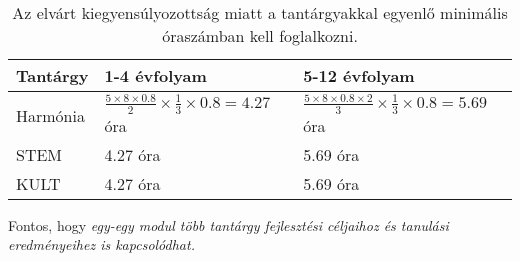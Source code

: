 \begin{table}

  \begin{tabular}{ l|l|l }

    \textbf{Tantárgy} & \textbf{1-4 évfolyam}          & \textbf{5-12 évfolyam}
    \\ \hline
    Harmónia          & $\frac{5 \times 8 \times 0.8}{2} \times \frac{1}{3}
      \times 0.8 =
    4.27$ óra         &
    $\frac{5 \times 8 \times 0.8 \times 2}{3} \times \frac{1}{3} \times 0.8 =
      5.69$
    óra
    \\ \hline
    STEM              & 4.27 óra
                      & 5.69 óra                                            \\ \hline
    KULT              & 4.27 óra
                      & 5.69 óra                                            \\ \hline

  \end{tabular}
  \caption{Az elvárt kiegyensúlyozottság miatt a tantárgyakkal egyenlő
    minimális óraszámban kell foglalkozni.}
  \label{tbl:oraszamok}
\end{table}

Fontos, hogy \emph{egy-egy modul több tantárgy fejlesztési céljaihoz és
  tanulási eredményeihez is kapcsolódhat.}